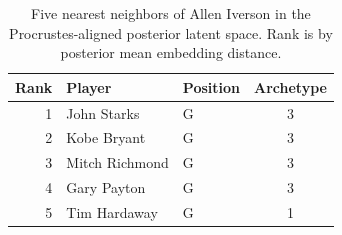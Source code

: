 \begin{table}[htbp]
  \centering\small
  \begin{tabular}{rllc}
    \toprule
    Rank & Player & Position & Archetype \\
    \midrule
    1 & John Starks & G & 3 \\
    2 & Kobe Bryant & G & 3 \\
    3 & Mitch Richmond & G & 3 \\
    4 & Gary Payton & G & 3 \\
    5 & Tim Hardaway & G & 1 \\
    \bottomrule
  \end{tabular}
  \caption{Five nearest neighbors of Allen Iverson in the Procrustes-aligned posterior latent space. Rank is by posterior mean embedding distance.}
  \label{tab:Allen_Iverson_neighbors}
\end{table}

